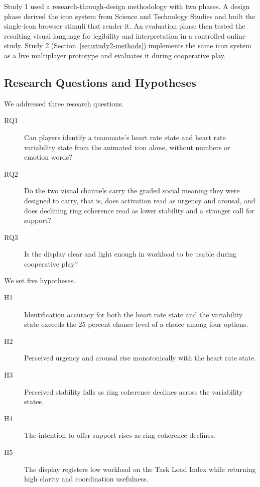 \documentclass[manuscript,review,anonymous]{acmart}
\begin{document}
Study 1 used a research-through-design methodology with two phases. A design phase derived the icon system from Science and Technology Studies and built the single-icon browser stimuli that render it. An evaluation phase then tested the resulting visual language for legibility and interpretation in a controlled online study. Study 2 (Section~\ref{sec:study2-methods}) implements the same icon system as a live multiplayer prototype and evaluates it during cooperative play.

\subsection{Research Questions and Hypotheses}
\label{sec:study1-rqh}
We addressed three research questions.
\begin{description}
    \item[RQ1] Can players identify a teammate's heart rate state and heart rate variability state from the animated icon alone, without numbers or emotion words?
    \item[RQ2] Do the two visual channels carry the graded social meaning they were designed to carry, that is, does activation read as urgency and arousal, and does declining ring coherence read as lower stability and a stronger call for support?
    \item[RQ3] Is the display clear and light enough in workload to be usable during cooperative play?
\end{description}

We set five hypotheses.
\begin{description}
    \item[H1] Identification accuracy for both the heart rate state and the variability state exceeds the 25 percent chance level of a choice among four options.
    \item[H2] Perceived urgency and arousal rise monotonically with the heart rate state.
    \item[H3] Perceived stability falls as ring coherence declines across the variability states.
    \item[H4] The intention to offer support rises as ring coherence declines.
    \item[H5] The display registers low workload on the Task Load Index while returning high clarity and coordination usefulness.
\end{description}
\end{document}
